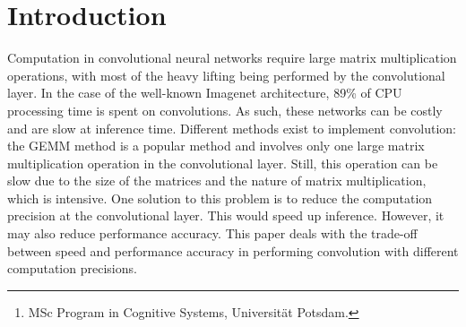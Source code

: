 \documentclass[12pt]{report}
\title{\doctitle}
\author{C. Clayton Violand\footnote{MSc Program in Cognitive Systems, Universit\"at Potsdam.}}
\begin{document}
\maketitle










\begin{abstract}
It is well-known in principle that the full precision of computer hardware (e.g. 32 or 64 bit floats) is not really needed for neural networks. By design they have to be robust against small perturbations in the data and also the activations of units in higher layers (i.e. dropout). Thus, there is a recent trend of moving to low-precision calculations in order to speed up inference in deep neural networks. In fact, the new nVidia GPUs coming out at the end of this year will feature an 8-bit integer mode specifically for inference in deep Neural Networks, which in theory runs 4x as fast as single precision floats. However, there are few studies on when exactly low precision is enough and how much speed this can bring. This thesis deals with the implementation of neural networks with different computing precisions, and how well they still work depending on the Neural Network architecture. It also explores the gain in speed obtainable on different architectures.
\end{abstract}










\section{Introduction}
Computation in convolutional neural networks require large matrix multiplication operations, with most of the heavy lifting being performed by the convolutional layer. In the case of the well-known Imagenet architecture, 89\% of CPU processing time is spent on convolutions. As such, these networks can be costly and are slow at inference time. Different methods exist to implement convolution: the GEMM method is a popular method and involves only one large matrix multiplication operation in the convolutional layer. Still, this operation can be slow due to the size of the matrices and the nature of matrix multiplication, which is intensive. 
One solution to this problem is to reduce the computation precision at the convolutional layer. This would speed up inference. However, it may also reduce performance accuracy. This paper deals with the trade-off between speed and performance accuracy in performing convolution with different computation precisions.
\end{document}
